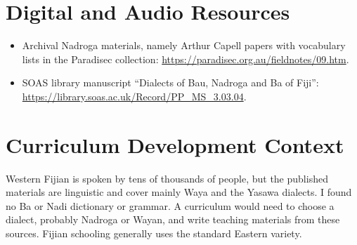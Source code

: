 \documentclass[12pt]{article}
\begin{document}
\section{Digital and Audio Resources}
\begin{itemize}
\item Archival Nadroga materials, namely Arthur Capell papers with vocabulary lists in the Paradisec collection: \url{https://paradisec.org.au/fieldnotes/09.htm}.
\item SOAS library manuscript ``Dialects of Bau, Nadroga and Ba of Fiji'': \url{https://library.soas.ac.uk/Record/PP_MS_3.03.04}.
\end{itemize}

\section{Curriculum Development Context}
Western Fijian is spoken by tens of thousands of people, but the published materials are linguistic and cover mainly Waya and the Yasawa dialects. I found no Ba or Nadi dictionary or grammar. A curriculum would need to choose a dialect, probably Nadroga or Wayan, and write teaching materials from these sources. Fijian schooling generally uses the standard Eastern variety.
\end{document}

